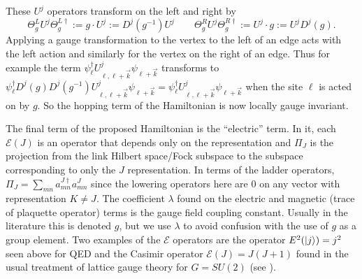 \documentclass[10pt,reqno]{amsart}
\numberwithin{equation}{section}
\begin{document}
	These $U^j$ operators transform on the left and right by 
	\begin{equation}
		\Theta_{g}^L U^j \Theta_g^{L\dagger} :=g\cdot U^j := D^j(g^{-1})U^j \qquad \Theta_{g}^R U^j \Theta_g^{R\dagger} := U^j \cdot g := U^j D^j(g).
	\end{equation}
	Applying a gauge transformation to the vertex to the left of an edge acts with the left action and similarly for the vertex on the right of an edge.
	Thus for example the term $\psi_\ell^\dagger U_{\ell,\ell+\vec{k}}^j\psi_{\ell+\vec{k}}$ transforms to $\psi_\ell^\dagger D^j(g) D^j(g^{-1})U_{\ell,\ell+\vec{k}}^j\psi_{\ell+\vec{k}} = \psi_\ell^\dagger U_{\ell,\ell+\vec{k}}^j\psi_{\ell+\vec{k}}$ when the site $\ell$ is acted on by $g$.
	So the hopping term of the Hamiltonian is now locally gauge invariant. \\
	
	
	
	The final term of the proposed Hamiltonian is the ``electric'' term. 
	In it, each $\mathcal{E}(J)$ is an operator that depends only on the representation and $\Pi_J$ is the projection from the link Hilbert space/Fock subspace to the subspace corresponding to only the $J$ representation. 
	In terms of the ladder operators, $\Pi_J=\sum_{mn} a^{J\dagger}_{mn}a^J_{mn}$ since the lowering operators here are 0 on any vector with representation $K\neq J$.
	The coefficient $\lambda$ found on the electric and magnetic (trace of plaquette operator) terms is the gauge field coupling constant. 
	Usually in the literature this is denoted $g$, but we use $\lambda$ to avoid confusion with the use of $g$ as a group element.
	Two examples of the $\mathcal{E}$ operators are the operator $E^2(\ket{j})=j^2$ seen above for QED and the Casimir operator $\mathcal{E}(J)=J(J+1)$ found in the usual treatment of lattice gauge theory for $G=SU(2)$ (see \cite{KogutSusskind75}).
	
\end{document}
